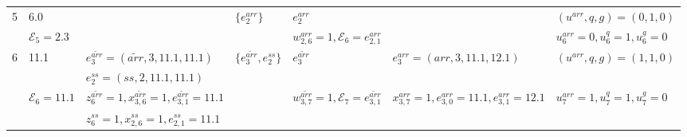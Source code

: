 \documentclass[suppldata]{interact}
\theoremstyle{plain}
\theoremstyle{definition}
\theoremstyle{remark}
\begin{document}
\begin{landscape}
\begin{table}
\begin{tabular}{lllllll}
			
			5 & 6.0&&$\{e^{arr}_2\}$&$e^{arr}_{2}$&&$(u^{arr},q,g)=(0,1,0)$\\
			&$\mathcal{E}_5=2.3$&&&$w^{{arr}}_{2,6}=1,\mathcal{E}_6=e^{{arr}}_{2,1}$&&$u^{arr}_6=0,u^{q}_6=1,u^{g}_6=0$\\\hline
			
			
			6 &11.1 &$e^{\tilde{arr}}_3=({\tilde{arr}},3,11.1,11.1)$&$\{e^{\tilde{arr}}_3,e^{ss}_2\}$ &$e^{\tilde{arr}}_3$ &$e^{{arr}}_3=({{arr}},3,11.1,12.1)$ &$(u^{arr},q,g)=(1,1,0)$\\
			&&$e^{ss}_2=(ss,2,11.1,11.1)$&&&&\\
			&$\mathcal{E}_6=11.1$&$z^{\tilde{arr}}_6=1, x^{\tilde{arr}}_{3,6}=1,e^{\tilde{arr}}_{3,1}=11.1$&&$w^{\tilde{arr}}_{3,7}=1,\mathcal{E}_7=e^{\tilde{arr}}_{3,1}$&$x^{{arr}}_{3,7}=1, e^{{arr}}_{3,0}=11.1, e^{{arr}}_{3,1}=12.1$&$u^{arr}_7=1,u^{q}_7=1,u^{g}_7=0$\\
			&&$z^{ss}_6=1,x^{ss}_{2,6}=1,e^{ss}_{2,1}=11.1$ &&&&\\\hline
			
			
			
			
			
			
			
		\end{tabular}
	\end{table}
\end{landscape}
\end{document}
